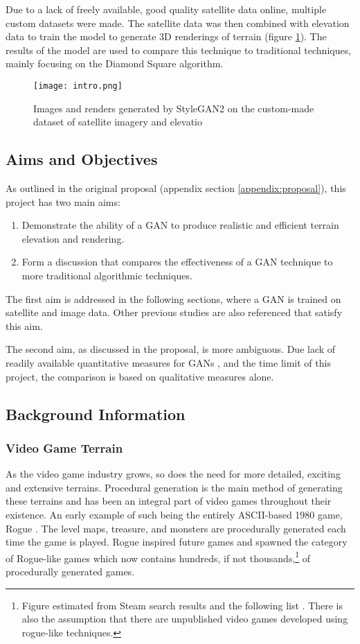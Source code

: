 \documentclass[a4paper]{report}
\begin{document}
Due to a lack of freely available, good quality satellite data online, multiple custom datasets were made. The satellite data was then combined with elevation data to train the model to generate 3D renderings of terrain (figure \ref{fig:intro}). The results of the model are used to compare this technique to traditional techniques, mainly focusing on the Diamond Square algorithm.

\begin{figure}[H]
    \centering
        \texttt{[image: intro.png]}
        \caption{Images and renders generated by StyleGAN2 on the custom-made dataset of satellite imagery and elevatio}
        \label{fig:intro}
\end{figure}

\subsection{Aims and Objectives}
As outlined in the original proposal (appendix section \ref{appendix:proposal}), this project has two main aims:

\begin{enumerate}
    \item Demonstrate the ability of a GAN to produce realistic and efficient terrain elevation and rendering.
    \item Form a discussion that compares the effectiveness of a GAN technique to more traditional algorithmic techniques.
\end{enumerate}

The first aim is addressed in the following sections, where a GAN is trained on satellite and image data. Other previous studies are also referenced that satisfy this aim.

The second aim, as discussed in the proposal, is more ambiguous. Due lack of readily available quantitative measures for GANs \cite{howgood}, and the time limit of this project, the comparison is based on qualitative measures alone.

\subsection{Background Information}
\subsubsection{Video Game Terrain}
As the video game industry grows, so does the need for more detailed, exciting and extensive terrains. Procedural generation is the main method of generating these terrains and has been an integral part of video games throughout their existence. An early example of such being the entirely ASCII-based 1980 game, Rogue \cite{rogue}. The level maps, treasure, and monsters are procedurally generated each time the game is played. Rogue inspired future games and spawned the category of Rogue-like games which now contains hundreds, if not thousands,\footnote{Figure estimated from Steam search results \cite{roguelikeSteam} and the following list \cite{roguebasin_2020}. There is also the assumption that there are unpublished video games developed using rogue-like techniques.} of procedurally generated games.
\end{document}
